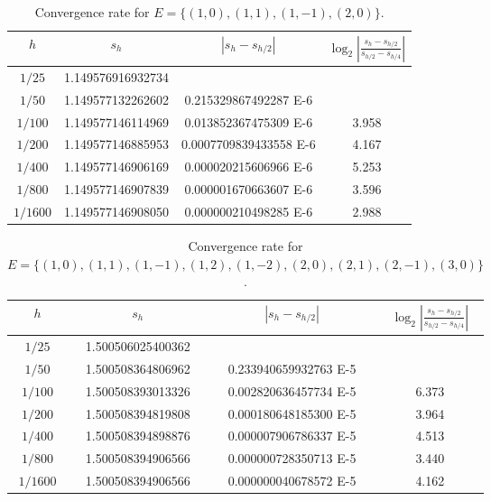 \documentclass[10pt]{article}
\theoremstyle{definition}
\numberwithin{equation}{section}
\numberwithin{figure}{section}
\numberwithin{table}{section}
\begin{document}
\begin{table}[b]
\centering
\begin{tabular}{c|ccc}
$h$&$s_h$&$|s_h-s_{h/2}|$&$\log_2\left|\frac{s_h-s_{h/2}}{s_{h/2}-s_{h/4}}\right|$\\\hline
$1/25$ & 1.149576916932734 &  & \\
$1/50$ & 1.149577132262602 & 0.215329867492287 E-6  & \\
$1/100$ & 1.149577146114969 & 0.013852367475309 E-6  & 3.958 \\
$1/200$ & 1.149577146885953 & 0.0007709839433558 E-6  & 4.167  \\
$1/400$ & 1.149577146906169  & 0.000020215606966 E-6  & 5.253 \\
$1/800$ & 1.149577146907839 & 0.000001670663607 E-6  & 3.596\\
$1/1600$ & 1.149577146908050 & 0.000000210498285 E-6 & 2.988\\
\end{tabular}
\caption{Convergence rate for $E=\{(1,0),(1,1),(1,-1),(2,0)\}$.}
\label{table:conv2d4}
\end{table}

\begin{table}[b]
\centering
\begin{tabular}{c|ccc}
$h$&$s_h$&$|s_h-s_{h/2}|$&$\log_2\left|\frac{s_h-s_{h/2}}{s_{h/2}-s_{h/4}}\right|$\\\hline
$1/25$ & 1.500506025400362 &  & \\
$1/50$ & 1.500508364806962 & 0.233940659932763 E-5  & \\
$1/100$ & 1.500508393013326 & 0.002820636457734 E-5  & 6.373 \\
$1/200$ & 1.500508394819808 & 0.000180648185300 E-5  & 3.964  \\
$1/400$ & 1.500508394898876 & 0.000007906786337 E-5  & 4.513 \\
$1/800$ & 1.500508394906566 & 0.000000728350713 E-5  & 3.440\\
$1/1600$ & 1.500508394906566 & 0.000000040678572 E-5 & 4.162\\
\end{tabular}
\caption{Convergence rate for $E=\{(1,0),(1,1),(1,-1),(1,2),(1,-2),(2,0),(2,1),(2,-1),(3,0)\}$.}
\label{table:conv2d9}
\end{table}
\end{document}
